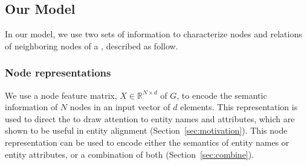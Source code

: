 	
	\subsection{Our Model}
	\label{section:rgcn}	

In our model, we use two sets of information to characterize nodes and relations of neighboring nodes of a \KG, described as follow.




%



\subsubsection{Node representations}
	\label{subsection:Node Representations}
   We use a node feature matrix, $X \in \mathbb{R}^{N \times d}$ of $G$, to encode the semantic information of $N$  nodes in an
   input vector of $d$ elements. This representation is used to direct the \RGCN to draw attention to entity names and attributes, which are shown to be
   useful in entity alignment (Section~\ref{sec:motivation}). This node representation can be used to encode either the semantics of entity names
   or entity attributes, or a combination of both (Section~\ref{sec:combine}).



